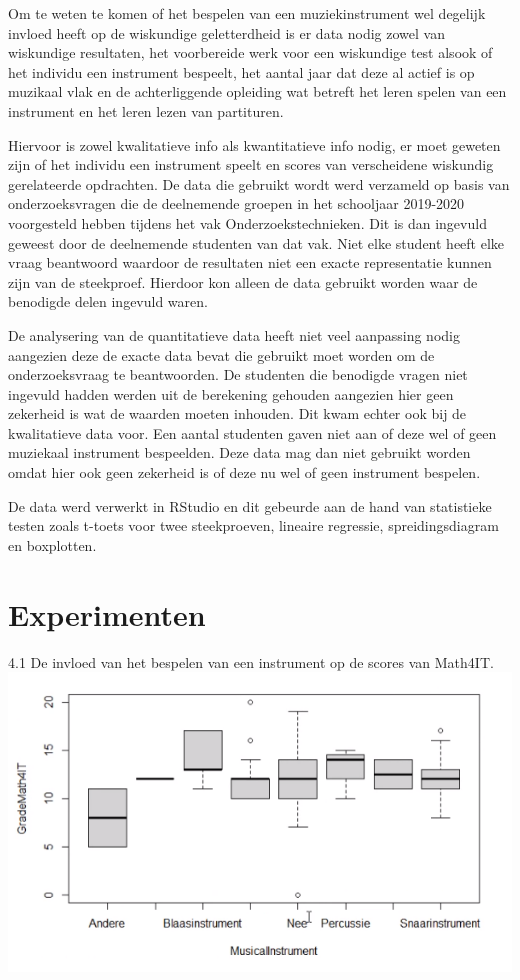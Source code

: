 \documentclass{hogent-article}
\begin{document}
Om te weten te komen of het bespelen van een muziekinstrument wel degelijk invloed heeft op de wiskundige geletterdheid is er data nodig zowel van wiskundige resultaten, het voorbereide werk voor een wiskundige test alsook of het individu een instrument bespeelt, het aantal jaar dat deze al actief is op muzikaal vlak en de achterliggende opleiding wat betreft het leren spelen van een instrument en het leren lezen van partituren.

Hiervoor is zowel kwalitatieve info als kwantitatieve info nodig, er moet geweten zijn of het individu een instrument speelt en scores van verscheidene wiskundig gerelateerde opdrachten.
De data die gebruikt wordt werd verzameld op basis van onderzoeksvragen die de deelnemende groepen in het schooljaar 2019-2020 voorgesteld hebben tijdens het vak Onderzoekstechnieken. Dit is dan ingevuld geweest door de deelnemende studenten van dat vak. 
Niet elke student heeft elke vraag beantwoord waardoor de resultaten niet een exacte representatie kunnen zijn van de steekproef. Hierdoor kon alleen de data gebruikt worden waar de benodigde delen ingevuld waren.

De analysering van de quantitatieve data heeft niet veel aanpassing nodig aangezien deze de exacte data bevat die gebruikt moet worden om de onderzoeksvraag te beantwoorden. De studenten die benodigde vragen niet ingevuld hadden werden uit de berekening gehouden aangezien hier geen zekerheid is wat de waarden moeten inhouden. Dit kwam echter ook bij de kwalitatieve data voor. Een aantal studenten gaven niet aan of deze wel of geen muziekaal instrument bespeelden. Deze data mag dan niet gebruikt worden omdat hier ook geen zekerheid is of deze nu wel of geen instrument bespelen.

De data werd verwerkt in RStudio en dit gebeurde aan de hand van statistieke testen zoals t-toets voor twee steekproeven, lineaire regressie, spreidingsdiagram en boxplotten.

\section{Experimenten}

4.1 De invloed van het bespelen van een instrument op de scores van Math4IT.\newline
\includegraphics[scale=0.5]{../rapport/img/1.PNG}
\end{document}
